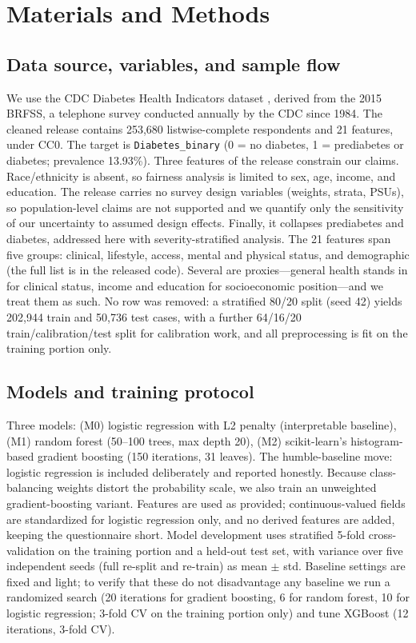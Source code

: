 \documentclass[conference]{IEEEtran}
\begin{document}
\section{Materials and Methods}

\subsection{Data source, variables, and sample flow}
We use the CDC Diabetes Health Indicators dataset \cite{cdc2017}, derived from the 2015 BRFSS, a telephone survey conducted annually by the CDC since 1984. The cleaned release contains 253{,}680 listwise-complete respondents and 21 features, under CC0. The target is \texttt{Diabetes\_binary} (0 = no diabetes, 1 = prediabetes or diabetes; prevalence 13.93\%). Three features of the release constrain our claims. Race/ethnicity is absent, so fairness analysis is limited to sex, age, income, and education. The release carries no survey design variables (weights, strata, PSUs), so population-level claims are not supported and we quantify only the sensitivity of our uncertainty to assumed design effects. Finally, it collapses prediabetes and diabetes, addressed here with severity-stratified analysis. The 21 features span five groups: clinical, lifestyle, access, mental and physical status, and demographic (the full list is in the released code). Several are proxies---general health stands in for clinical status, income and education for socioeconomic position---and we treat them as such. No row was removed: a stratified 80/20 split (seed 42) yields 202{,}944 train and 50{,}736 test cases, with a further 64/16/20 train/calibration/test split for calibration work, and all preprocessing is fit on the training portion only.

\subsection{Models and training protocol}
Three models: (M0) logistic regression with L2 penalty (interpretable baseline), (M1) random forest (50--100 trees, max depth 20), (M2) scikit-learn's histogram-based gradient boosting (150 iterations, 31 leaves). The humble-baseline move: logistic regression is included deliberately and reported honestly. Because class-balancing weights distort the probability scale, we also train an unweighted gradient-boosting variant. Features are used as provided; continuous-valued fields are standardized for logistic regression only, and no derived features are added, keeping the questionnaire short. Model development uses stratified 5-fold cross-validation on the training portion and a held-out test set, with variance over five independent seeds (full re-split and re-train) as mean $\pm$ std. Baseline settings are fixed and light; to verify that these do not disadvantage any baseline we run a randomized search (20 iterations for gradient boosting, 6 for random forest, 10 for logistic regression; 3-fold CV on the training portion only) and tune XGBoost \cite{xgboost} (12 iterations, 3-fold CV).
\end{document}
